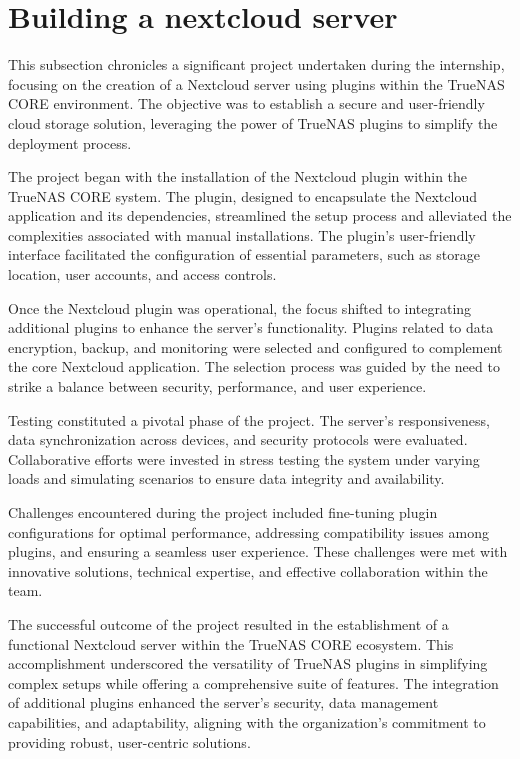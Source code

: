 \section{Building a nextcloud server}
This subsection chronicles a significant project undertaken during the internship, focusing on the creation of a Nextcloud server using plugins within the TrueNAS CORE environment. The objective was to establish a secure and user-friendly cloud storage solution, leveraging the power of TrueNAS plugins to simplify the deployment process.

The project began with the installation of the Nextcloud plugin within the TrueNAS CORE system. The plugin, designed to encapsulate the Nextcloud application and its dependencies, streamlined the setup process and alleviated the complexities associated with manual installations. The plugin's user-friendly interface facilitated the configuration of essential parameters, such as storage location, user accounts, and access controls.

Once the Nextcloud plugin was operational, the focus shifted to integrating additional plugins to enhance the server's functionality. Plugins related to data encryption, backup, and monitoring were selected and configured to complement the core Nextcloud application. The selection process was guided by the need to strike a balance between security, performance, and user experience.

Testing constituted a pivotal phase of the project. The server's responsiveness, data synchronization across devices, and security protocols were evaluated. Collaborative efforts were invested in stress testing the system under varying loads and simulating scenarios to ensure data integrity and availability.

Challenges encountered during the project included fine-tuning plugin configurations for optimal performance, addressing compatibility issues among plugins, and ensuring a seamless user experience. These challenges were met with innovative solutions, technical expertise, and effective collaboration within the team.

The successful outcome of the project resulted in the establishment of a functional Nextcloud server within the TrueNAS CORE ecosystem. This accomplishment underscored the versatility of TrueNAS plugins in simplifying complex setups while offering a comprehensive suite of features. The integration of additional plugins enhanced the server's security, data management capabilities, and adaptability, aligning with the organization's commitment to providing robust, user-centric solutions.
